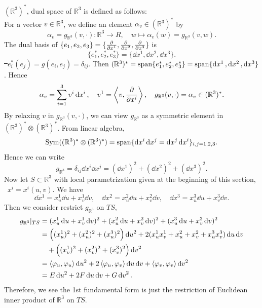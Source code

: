 \((\mathbb{R}^3)^*\), dual space of \(\mathbb{R}^3\) is defined as follows:\\
For a vector \(v\in \mathbb{R}^3\), we define an element \(\alpha_v\in(\mathbb{R}^3)
^*\) by \[
    \alpha_v=g_{\mathbb{R}^3}(v,\cdot)\colon \mathbb{R}^3\to R, \quad 
    w\mapsto \alpha_v(w)=g_{\mathbb{R}^3}(v,w)
.\] The dual basis of \(\{e_1,e_2,e_3\}=\{\pdv{x^1},\pdv{x^2},\pdv{x^3}\}\) is \[
    \{e_1^*,e_2^*,e_3^*\}=\{\dd{x^1},\dd{x^2},\dd{x^3}\}
.\] \st\ \(e_i^*(e_j)=g(e_i,e_j)=\delta_{ij}\). Then \((\mathbb{R}^3)^*=\operatorname{span}
\{e_1^*,e_2^*,e_3^*\}=\operatorname{span}\{\dd{x^1},\dd{x^2},\dd{x^3}\}\). Hence \[
    \alpha_v=\sum_{i=1}^3 v^i \dd{x^i},\quad
    v^1=\left<v,\pdv{x^i}\right> ,\quad
    g_{\mathbb{R}^3}(v,\cdot)=\alpha_v\in (\mathbb{R}^3)^*
.\] By relaxing \(v\) in \(g_{\mathbb{R}^3}(v,\cdot)\), we can view \(g_{\mathbb{R}
^3}\) as a symmetric element in \((\mathbb{R}^3)^*\otimes (\mathbb{R}^3)^*\).
From linear algebra, \[
    \mathrm{Sym}((\mathbb{R}^3)^*\otimes (\mathbb{R}^3)^*)=
    \operatorname{span}\{\dd{x^i}\dd{x^j}=\dd{x^j}\dd{x^i}\}_{i,j=1,2,3}
.\] Hence we can write \[
    g_{\mathbb{R}^3}=\delta_{ij}\dd{x^i}\dd{x^j}=
    (\dd{x^1})^2+(\dd{x^2})^2+(\dd{x^3})^2
.\] Now let \(S\subset \mathbb{R}^3\) with local parametrization given at the
beginning of this section, \ie\ \(x^i=x^i(u,v)\). We have \[
    \dd{x^1}=x_u^1\dd{u}+x_v^1\dd{v},\quad
    \dd{x^2}=x_u^2\dd{u}+x_v^2\dd{v},\quad
    \dd{x^3}=x_u^3\dd{u}+x_v^3\dd{v}
.\] Then we consider restrict \(g_{\mathbb{R}^3}\) on \(TS\),
\begin{align*}
    g_{\mathbb{R}^3}|_{TS}
    &=(x_u^1\dd{u}+x_v^1\dd{v})^2+(x_u^2\dd{u}+x_v^2\dd{v})^2
    +(x_u^3\dd{u}+x_v^3\dd{v})^2 \\
    &=\left((x_u^1)^2+(x_u^2)^2+(x_u^3)^2\right)\dd{u}^2
    +2(x_u^1x_v^1+x_u^2+x_v^2+x_u^3x_v^3)\dd{u}\dd{v} \\
    &\quad+\left((x_v^1)^2+(x_v^2)^2+(x_v^3)^2\right)\dd{v}^2 \\
    &=\left<\varphi_u,\varphi_u\right>\dd{u}^2+2\left<\varphi_u,\varphi_v\right>\dd{u}\dd{v}
    +\left<\varphi_v,\varphi_v\right>\dd{v^2} \\
    &=E\dd{u^2}+2F\dd{u}\dd{v}+G\dd{v}^2
.\end{align*}
Therefore, we see the 1st fundamental form is just the restriction of Euclidean
inner product of \(\mathbb{R}^3\) on \(TS\).

\newpage

